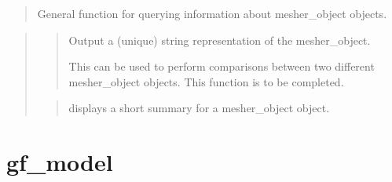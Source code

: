 \documentclass[a4paper,11pt,english]{sphinxmanual}
\begin{document}
\begin{sphinxVerbatim}[commandchars=\\\{\}]
    
  
\end{sphinxVerbatim}

\sphinxAtStartPar
{}
\begin{quote}

\sphinxAtStartPar
General function for querying information about mesher\_object objects.
\end{quote}

\sphinxAtStartPar
{}
\begin{quote}

\sphinxAtStartPar
{}
\begin{quote}

\sphinxAtStartPar
Output a (unique) string representation of the mesher\_object.

\sphinxAtStartPar
This can be used to perform comparisons between two
different mesher\_object objects.
This function is to be completed.
\end{quote}

\sphinxAtStartPar
{}
\begin{quote}

\sphinxAtStartPar
displays a short summary for a mesher\_object object.
\end{quote}
\end{quote}


\section{gf\_model}
\label{\detokenize{matlab_octave/cmdref_gf_model:gf-model}}\label{\detokenize{matlab_octave/cmdref_gf_model::doc}}
\sphinxAtStartPar
{}

\begin{sphinxVerbatim}[commandchars=\\\{\}]
  
  
\end{sphinxVerbatim}
\end{document}
